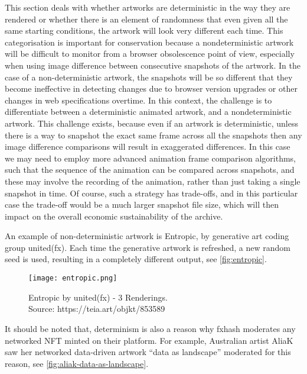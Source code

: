 This section deals with whether artworks are deterministic in the way they are rendered or whether there is an element of randomness that even given all the same starting conditions, the artwork will look very different each time. This categorisation is important for conservation because a nondeterministic artwork will be difficult to monitor from a browser obsolescence point of view, especially when using image difference between consecutive snapshots of the artwork. In the case of a non-deterministic artwork, the snapshots will be so different that they become ineffective in detecting changes due to browser version upgrades or other changes in web specifications overtime. In this context, the challenge is to differentiate between a deterministic animated artwork, and a nondeterministic artwork. This challenge exists, because even if an artwork is deterministic, unless there is a way to snapshot the exact same frame across all the snapshots then any image difference comparisons will result in exaggerated differences. In this case we may need to employ more advanced animation frame comparison algorithms, such that the sequence of the animation can be compared across snapshots, and these may involve the recording of the animation, rather than just taking a single snapshot in time. Of course, such a strategy has trade-offs, and in this particular case the trade-off would be a much larger snapshot file size, which will then impact on the overall economic sustainability of the archive.

An example of non-deterministic artwork is Entropic, by generative art coding group united(fx). Each time the generative artwork is refreshed, a new random seed is used, resulting in a completely different output, see \autoref{fig:entropic}.

\begin{figure}[h]
    \centering
    \captionsetup{justification=centering}
    \texttt{[image: entropic.png]}
    \captionsetup{justification=centering}
    \caption[Entropic by united(fx) - 3 Renderings]{Entropic by united(fx) - 3 Renderings. \\ Source: https://teia.art/objkt/853589}
    \label{fig:entropic}
\end{figure}


It should be noted that, determinism is also a reason why fxhash moderates any networked NFT minted on their platform. For example, Australian artist AliaK saw her networked data-driven artwork ``data as landscape'' moderated for this reason, see \autoref{fig:aliak-data-as-landscape}.

